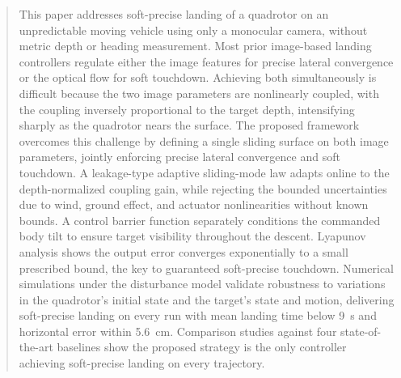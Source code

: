 \documentclass{IEEEtaes}
\begin{document}
\begin{abstract}This paper addresses soft-precise landing of a quadrotor on an unpredictable moving vehicle using only a monocular camera, without metric depth or heading measurement. Most prior image-based landing controllers regulate either the image features for precise lateral convergence or the optical flow for soft touchdown. Achieving both simultaneously is difficult because the two image parameters are nonlinearly coupled, with the coupling inversely proportional to the target depth, intensifying sharply as the quadrotor nears the surface. The proposed framework overcomes this challenge by defining a single sliding surface on both image parameters, jointly enforcing precise lateral convergence and soft touchdown. A leakage-type adaptive sliding-mode law adapts online to the depth-normalized coupling gain, while rejecting the bounded uncertainties due to wind, ground effect, and actuator nonlinearities without known bounds. A control barrier function separately conditions the commanded body tilt to ensure target visibility throughout the descent. Lyapunov analysis shows the output error converges exponentially to a small prescribed bound, the key to guaranteed soft-precise touchdown. Numerical simulations under the disturbance model validate robustness to variations in the quadrotor's initial state and the target's state and motion, delivering soft-precise landing on every run with mean landing time below 9~s and horizontal error within 5.6~cm. Comparison studies against four state-of-the-art baselines show the proposed strategy is the only controller achieving soft-precise landing on every trajectory.
\end{abstract}

\end{document}
